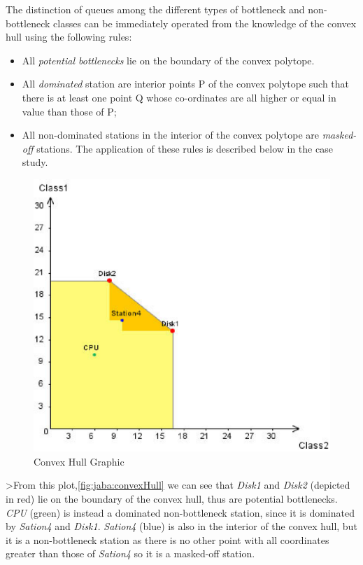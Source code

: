 The distinction of queues among the different types of bottleneck and non-bottleneck classes can be immediately operated from the knowledge of the convex hull using the following rules:
\begin{itemize}
    \item All \emph{potential bottlenecks} lie on the boundary of the convex polytope.
    \item All \emph{dominated} station are interior points P of the convex polytope such that there is at least one point Q whose co-ordinates are all higher or equal in value than those of P;
    \item All non-dominated stations in the interior of the convex polytope are \emph{masked-off} stations.
The application of these rules is described below in the case study.
\end{itemize}
\begin{figure}[htbp]
    \begin{center}
        \includegraphics[scale=.5]{img/jaba/convexHull}
    \end{center}
    \caption{Convex Hull Graphic}
    \label{fig:jaba:convexHull}
\end{figure}

>From this plot,\autoref{fig:jaba:convexHull} we can see that \emph{Disk1} and \emph{Disk2} (depicted in red) lie on the boundary of the convex hull, thus are potential bottlenecks. \emph{CPU} (green) is instead a dominated non-bottleneck station, since  it is dominated by \emph{Sation4} and \emph{Disk1}. \emph{Sation4} (blue) is also in the interior of the convex hull, but it is a non-bottleneck station as there is no other point with all coordinates greater than those of \emph{Sation4} so it is a masked-off station.

